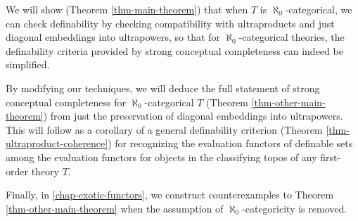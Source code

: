 We will show (Theorem \ref{thm-main-theorem}) that when $T$ is $\aleph_0$-categorical, we can check definability by checking compatibility with ultraproducts and just diagonal embeddings into ultrapowers, so that for $\aleph_0$-categorical theories, the definability criteria provided by strong conceptual completeness can indeed be simplified.

By modifying our techniques, we will deduce the full statement of strong conceptual completeness for $\aleph_0$-categorical $T$ (Theorem \ref{thm-other-main-theorem}) from just the preservation of diagonal embeddings into ultrapowers. This will follow as a corollary of a general definability criterion (Theorem \ref{thm-ultraproduct-coherence}) for recognizing the evaluation functors of definable sets among the evaluation functors for objects in the classifying topos of any first-order theory $T$.

Finally, in \autoref{chap-exotic-functors}, we construct counterexamples to Theorem \ref{thm-other-main-theorem} when the assumption of $\aleph_0$-categoricity is removed.

